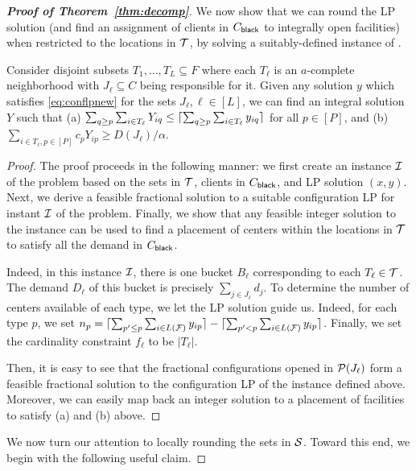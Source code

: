 \begin{proof}[{\bf Proof of Theorem~\ref{thm:decomp}}]
We now show that we can round the LP solution (and find an assignment of clients in $C_{\mathsf{black}}$ to integrally open facilities) when restricted to the locations in  ${\cal T}$, by solving a suitably-defined instance of \cckp.
\begin{lemma}\label{lem:rounding-local-neighborhoods}
	Consider disjoint subsets $T_1,\ldots,T_L \subseteq F$ where each $T_\ell$ is an $a$-complete neighborhood with $J_\ell\subseteq C$ being responsible for it.
	Given any solution $y$ which satisfies \eqref{eq:conflpnew} for the sets $J_\ell, \ell \in [L]$, we can find an integral solution $Y$ such that
	 (a) $\sum_{q\geq p} \sum_{i\in T_\ell} Y_{iq} \leq \lceil\sum_{q\geq p} \sum_{i\in T_\ell} y_{iq}\rceil$ for all $p\in [P]$, and
	 (b) $\sum_{i\in T_\ell,p\in [P]} c_p Y_{ip} \geq D(J_\ell)/\alpha$.
\end{lemma}
\begin{proof}
The proof proceeds in the following manner: we first create an instance ${\cal I}$ of the \cckp problem based on the sets in ${\cal T}$, clients in $C_{\mathsf{black}}$, and LP solution $(x,y)$. Next, we derive a feasible fractional solution to a suitable configuration LP for instant ${\cal I}$ of the \cckp problem. Finally, we show that any feasible integer solution to the \cckp instance can be used to find a placement of centers within the
locations in ${\cal T}$ to satisfy all the demand in $C_{\mathsf{black}}$.

Indeed, in this instance ${\cal I}$, there is one bucket $B_\ell$ corresponding to each $T_\ell \in {\cal T}$. The demand $D_\ell$ of this bucket is precisely $\sum_{j \in J_\ell} d_j$. To determine the number of centers available of each type, we let the LP solution guide us. Indeed, for each type $p$, we set $n_p = \lceil\sum_{p' \leq p} \sum_{i \in L({\cal F})} y_{ip}\rceil - \lceil\sum_{p' < p} \sum_{i \in L({\cal F})} y_{ip}\rceil$. Finally, we set the cardinality constraint $f_\ell$ to be $|T_{\ell}|$. 

Then, it is easy to see that the fractional configurations opened in ${\cal P}(J_\ell)$ form a feasible fractional solution to the configuration LP of the \cckp instance defined above. Moreover, we can easily map back an integer solution to a placement of facilities to satisfy (a) and (b) above. 
\end{proof}

\medskip \noindent We now turn our attention to locally rounding the sets in ${\cal S}$. Toward this end, we begin with the following useful claim.


\end{proof}
